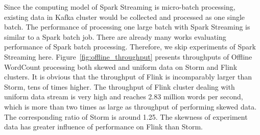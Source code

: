 Since the computing model of Spark Streaming is micro-batch processing, existing data in Kafka cluster would be collected and processed as one single batch. The performance of processing one large batch with Spark Streaming is similar to a Spark batch job. There are already many works evaluating performance of Spark batch processing. Therefore, we skip experiments of Spark Streaming here. Figure~\ref{fig:offline_throughput} presents throughputs of Offline WordCount processing both skewed and uniform data on Storm and Flink clusters. It is obvious that the throughput of Flink is incomparably larger than Storm, tens of times higher. The throughput of Flink cluster dealing with uniform data stream is very high and reaches 2.83 million words per second, which is more than two times as large as throughput of performing skewed data. The corresponding ratio of Storm is around 1.25. The skewness of experiment data has greater influence of performance on Flink than Storm.

